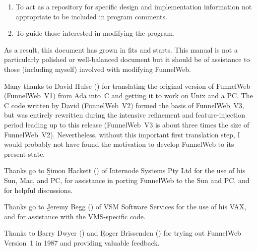 \begin{enumerate}

\item To act as a repository for specific design and implementation
information not appropriate to be included in program comments.

\item To guide those interested in modifying the program.

\end{enumerate}

As a result, this document has grown in fits and starts.
This manual is not a particularly polished or well-balanced document
but it should be of assistance to those (including myself) involved with
modifying FunnelWeb.

\bigskip




Many thanks to \b{David Hulse}
() for
translating the original version of FunnelWeb
(FunnelWeb~V1) from Ada into~C
and getting it to work on Unix and a PC.
The C code written by David (FunnelWeb~V2) formed
the basis of FunnelWeb~V3, but was
entirely rewritten during the intensive refinement and feature-injection
period leading up to this release (FunnelWeb~V3 is about three times
the size of FunnelWeb~V2).
Nevertheless, without this important first translation step,
I would probably not have found the motivation to develop FunnelWeb to its
present state.

Thanks go to \b{Simon Hackett}
() of Internode Systems
Pty Ltd for the use of his Sun, Mac, and PC, for assistance in porting
FunnelWeb to the Sun and PC, and for helpful discussions.

Thanks go to \b{Jeremy Begg}
() of VSM Software Services
for the use of his VAX, and for assistance with the VMS-specific code.

Thanks to \b{Barry Dwyer} ()
and \b{Roger Brissenden} ()
for trying out FunnelWeb Version~1 in 1987 and providing valuable feedback.

